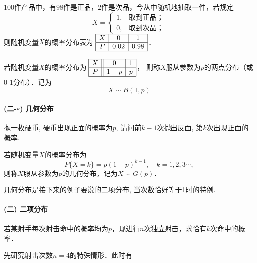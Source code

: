 \begin{example}
    $100$件产品中，有$98$件是正品，$2$件是次品，今从中随机地抽取一件，若规定
    \[X=\left\{ \begin{array}{ll} 1, & \text{取到正品；} \\
             0,      & \text{取到次品；}\end{array} \right.\]
    则随机变量$X$的概率分布表为
    $\begin{array}{|c|c|c|}\hline
            X & 0    & 1    \\ \hline
            P & 0.02 & 0.98 \\ \hline
        \end{array}$．
\end{example}

\begin{definition}[两点分布(0-1分布)]
    若随机变量$X$的概率分布为
    $\begin{array}{|c||c|c|}\hline
            X & 0   & 1 \\ \hline
            P & 1-p & p \\ \hline
        \end{array}$，
    则称$X$服从参数为$p$的两点分布（或 0-1分布）．记为$$X\sim B(1,p)$$
\end{definition}

\paragraph{(二-$\varepsilon$) 几何分布}

\begin{example}
    抛一枚硬币, 硬币出现正面的概率为$p$, 请问前$k-1$次抛出反面, 第$k$次出现正面的概率.
\end{example}

\begin{definition}
    若随机变量$X$的概率分布为
    \[P\{X=k\}=p(1-p)^{k-1},\quad k=1,2,3\cdots,\]
    则称$X$服从参数为$p$的几何分布，记为$X\sim G(p)$．
\end{definition}

几何分布是接下来的例子要说的二项分布, 当次数恰好等于1时的特例.

\paragraph{(二) 二项分布}

\begin{example}
    若某射手每次射击命中的概率均为$p$，现进行$n$次独立射击，求恰有$k$次命中的概率．
\end{example}
\def\1{\ding{51}} %
\def\0{\ding{55}} %
先研究射击次数$n=4$的特殊情形．此时有


